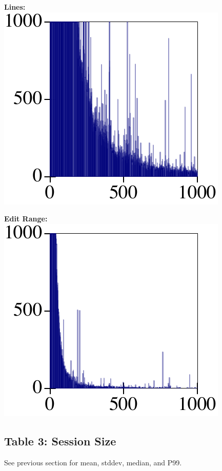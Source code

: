 \documentclass{article}
\begin{document}
\begin{minipage}{0.5\columnwidth}
  \textbf{Lines:}\\
  \includegraphics[width=0.4\columnwidth]{out/lines-distribution.pdf}
\end{minipage}\begin{minipage}{0.5\columnwidth}
  \textbf{Edit Range:}\\
  \includegraphics[width=0.4\columnwidth]{out/editrange-distribution.pdf}
\end{minipage}


\subsection*{Table 3: Session Size}

See previous section for mean, stddev, median, and P99.
\end{document}
